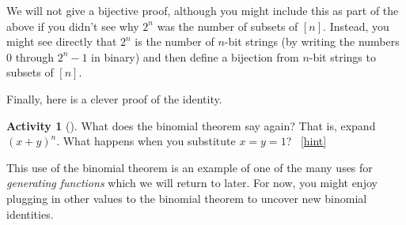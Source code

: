 \documentclass[10pt,]{book}
\theoremstyle{plain}
\theoremstyle{definition}
\theoremstyle{definition}
\theoremstyle{definition}
\newtheorem{activity}[project]{Activity}
\numberwithin{equation}{chapter}
\begin{document}
\hypertarget{p-588}{}%
We will not give a bijective proof, although you might include this as part of the above if you didn't see why \(2^n\) was the number of subsets of \([n]\).  Instead, you might see directly that \(2^n\) is the number of \(n\)-bit strings (by writing the numbers 0 through \(2^n - 1\) in binary) and then define a bijection from \(n\)-bit strings to subsets of \([n]\).%
\par
\hypertarget{p-589}{}%
Finally, here is a clever proof of the identity.%
\begin{activity}[]\label{act-pascalrowsum-binom}
\hypertarget{p-590}{}%
What does the binomial theorem say again?  That is, expand \((x+y)^n\).  What happens when you substitute \(x = y = 1\)?%
~\hfill{\tiny\hyperlink{a-79}{[hint]}\hypertarget{q-79}{}}\end{activity}
\hypertarget{p-592}{}%
This use of the binomial theorem is an example of one of the many uses for \emph{generating functions} which we will return to later.  For now, you might enjoy plugging in other values to the binomial theorem to uncover new binomial identities.%
\typeout{************************************************}
\typeout{************************************************}
\end{document}
